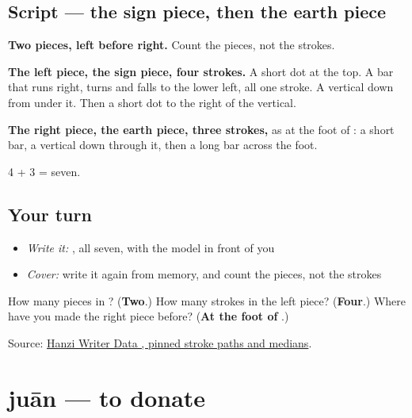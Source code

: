 \subsection*{Script — the sign piece, then the earth piece}

\begin{quote}
\end{quote}

\textbf{Two pieces, left before right.} Count the pieces, not the strokes.

\textbf{The left piece, the sign piece, four strokes.} A short dot at the top. A bar that runs right, turns and falls to the lower left, all one stroke. A vertical down from under it. Then a short dot to the right of the vertical.

\textbf{The right piece, the earth piece, three strokes,} as at the foot of : a short bar, a vertical down through it, then a long bar across the foot.

4 + 3 = seven.

\subsection*{Your turn}
\begin{itemize}
\raggedright
  \item \emph{Write it:} , all seven, with the model in front of you
  \item \emph{Cover:} write it again from memory, and count the pieces, not the strokes
\end{itemize}

\begin{tcolorbox}[breakable,colback=teal!4,colframe=teal!35!black,title={Before you move on}]
How many pieces in ? (\textbf{Two}.) How many strokes in the left piece? (\textbf{Four}.) Where have you made the right piece before? (\textbf{At the foot of }.)

Source: \href{https://raw.githubusercontent.com/chanind/hanzi-writer-data/68d10a4b21150cae5e1ebbd223eed289cf32d90c/data/\%E7\%A4\%BE.json}{Hanzi Writer Data , pinned stroke paths and medians}.
\end{tcolorbox}
\section[juān]{juān — to donate}

